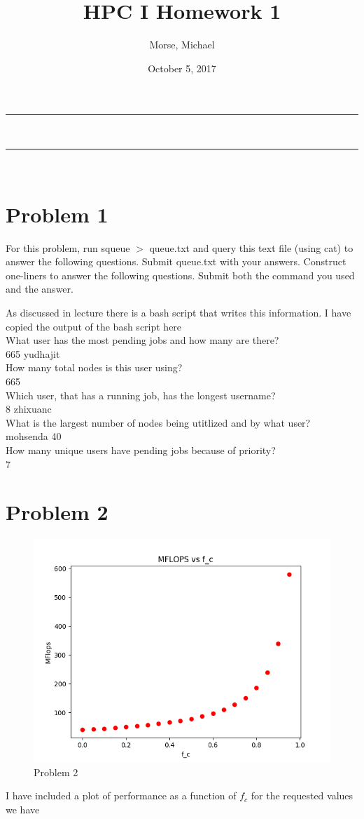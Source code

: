 \documentclass[12pt]{article}
\title{HPC I Homework 1}
\author{Morse, Michael}
\date{October 5, 2017}
\makeatletter
\newcommand{\nline}{\rule{\linewidth}{0.5pt}}
\theoremstyle{plain}
\theoremstyle{definition}
\renewcommand{\maketitle}{
\begin{center}
\nline\\
\vspace{2ex}
{\huge \textsc{\@title}}
\nline\\
{\large\textsc{\@author \hfill \@date}}
\vspace{4ex}
\end{center}
}
\makeatother
\begin{document}
\maketitle


\section*{Problem 1}
For this problem, run squeue $>$ queue.txt and query this text file (using cat) to answer
the following questions. Submit queue.txt with your answers. Construct one-liners to
answer the following questions. Submit both the command you used and the answer.

As discussed in lecture there is a bash script that writes this information. I have copied the output of the bash script here\\
What user has the most pending jobs and how many are there? \\
665 yudhajit\\
How many total nodes is this user using?\\
665\\
Which user, that has a running job, has the longest username?\\
8 zhixuanc\\
What is the largest number of nodes being utitlized and by what user?\\
mohsenda 40\\
How many unique users have pending jobs because of priority?\\
7

\section*{Problem 2}

\begin{figure}
\label{fig:problem2}
\includegraphics[scale=0.7]{problem2.png}
\caption{Problem 2}
\end{figure}
I have included a plot of performance as a function of $f_c$ for the requested values we have
\end{document}
